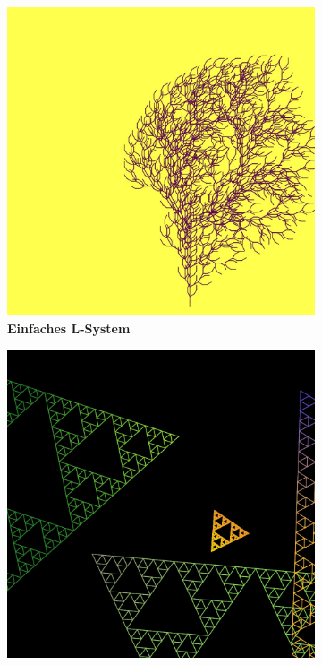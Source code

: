 \documentclass[../mciAusarbeitung.tex]{subfiles}
\begin{document}
	
\begin{figure}[H]
	\begin{subfigure}{0.5\linewidth}
		\includegraphics[width=0.95\linewidth]{"img/lsystem_simple.jpg"}
		\caption[Einfaches L-System]{\textbf{Einfaches L-System}}  
	\end{subfigure}
	\begin{subfigure}{0.5\linewidth}
		\includegraphics[width=0.95\linewidth]{"img/lsystem_sierpinski.jpg"}

\end{subfigure}
\end{figure}
\end{document}
